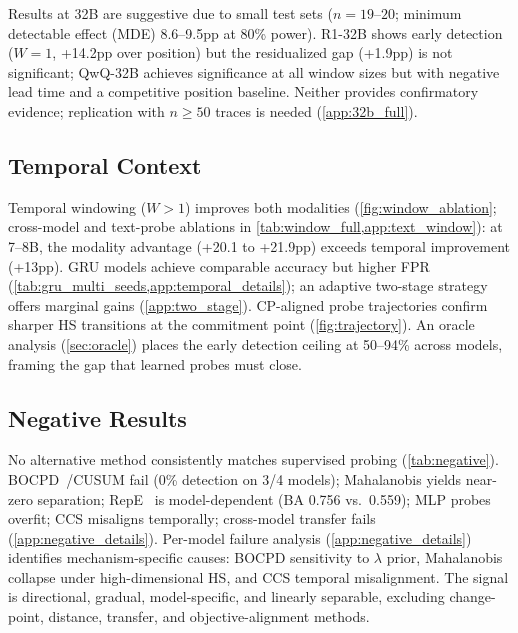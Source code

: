 Results at 32B are suggestive due to small test sets ($n{=}19$--$20$; minimum detectable effect (MDE) 8.6--9.5pp at 80\% power). R1-32B shows early detection ($W{=}1$, +14.2pp over position) but the residualized gap (+1.9pp) is not significant; QwQ-32B achieves significance at all window sizes but with negative lead time and a competitive position baseline. Neither provides confirmatory evidence; replication with $n \geq 50$ traces is needed (\cref{app:32b_full}).

\subsection{Temporal Context}\label{sec:temporal}

Temporal windowing ($W{>}1$) improves both modalities (\cref{fig:window_ablation}; cross-model and text-probe ablations in \cref{tab:window_full,app:text_window}): at 7--8B, the modality advantage (+20.1 to +21.9pp) exceeds temporal improvement (+13pp). GRU models achieve comparable accuracy but higher FPR (\cref{tab:gru_multi_seeds,app:temporal_details}); an adaptive two-stage strategy offers marginal gains (\cref{app:two_stage}). CP-aligned probe trajectories confirm sharper HS transitions at the commitment point (\cref{fig:trajectory}). An oracle analysis (\cref{sec:oracle}) places the early detection ceiling at 50--94\% across models, framing the gap that learned probes must close.

\subsection{Negative Results}\label{sec:negative}

No alternative method consistently matches supervised probing (\cref{tab:negative}). BOCPD~\citep{adams2007bayesian}/CUSUM fail (0\% detection on 3/4 models); Mahalanobis yields near-zero separation; RepE~\citep{zou2023representation} is model-dependent (BA 0.756 vs.\ 0.559); MLP probes overfit; CCS misaligns temporally; cross-model transfer fails (\cref{app:negative_details}). Per-model failure analysis (\cref{app:negative_details}) identifies mechanism-specific causes: BOCPD sensitivity to $\lambda$ prior, Mahalanobis collapse under high-dimensional HS, and CCS temporal misalignment. The signal is directional, gradual, model-specific, and linearly separable, excluding change-point, distance, transfer, and objective-alignment methods.

